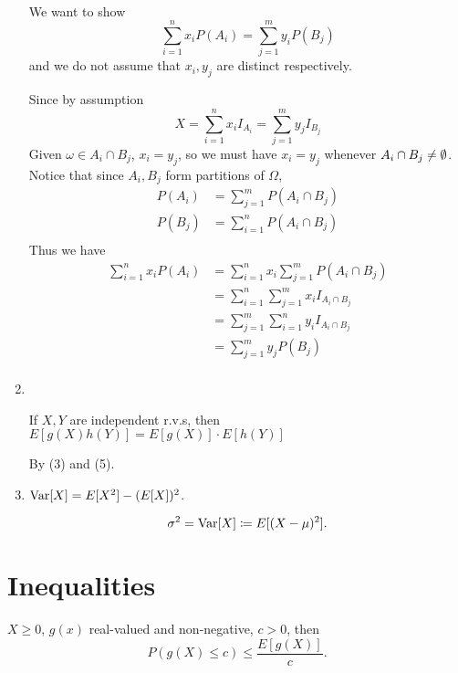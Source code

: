 \documentclass[class=article,crop=false]{standalone}
\begin{document}
\begin{claim}[]
\begin{enumerate}[label=\arabic*)]
~\begin{prf}
We want to show 
\[
	\sum_{ i= 1}^{ n} x_i P(A_i) = \sum_{ j= 1}^{ m} y_i P(B_j)
\]
and we do not assume that $ x_i, y_j$ are distinct respectively.

Since by assumption
\[
	X= \sum_{ i= 1}^{ n} x_i I_{A_i} = \sum_{ j= 1}^{ m} y_j I_{B_j}
\] 
Given $ \omega \in A_i \cap B_j$, $x_i = y_j$, so we must have $ x_i=y_j$ whenever $ A_i \cap B_j \neq \emptyset$. Notice that since $ A_i, B_j$ form partitions of $ \Omega$,
\begin{align*}
	P(A_i) &= \sum_{ j= 1}^{ m} P(A_i \cap B_j)\\
	P(B_j) &= \sum_{ i= 1}^{ n} P(A_i \cap B_j) \\
\end{align*}
Thus we have
\begin{align*}
	\sum_{ i= 1}^{ n} x_i P(A_i) &=\sum_{ i= 1}^{ n} x_i \sum_{ j= 1}^{ m} P(A_i \cap B_j) \\
	&= \sum_{ i= 1}^{ n} \sum_{ j= 1}^{ m} x_i I_{A_i \cap B_j} \\
	&= \sum_{ j= 1}^{ m} \sum_{ i= 1}^{ n} y_i I_{A_i \cap B_j}  \\
	&= \sum_{ j= 1}^{ m} y_j P(B_j) \\
\end{align*}
\end{prf}
\item
~\begin{coro}[]
	If $ X,Y$ are independent r.v.s, then  $ E[g(X)h(Y)]=E[g(X)] \cdot E[h(Y)]$
\end{coro}
\begin{note}[]
	By (3) and (5).
\end{note}
\item $ \operatorname{Var}[X] = E[X^2] - (E[X])^2$.
~\begin{defn}[variance]
\[
	\sigma^2= \operatorname{Var}[X] \coloneqq E[(X-\mu)^2]
.\]
\end{defn}

\end{enumerate}
\end{claim}


\section{Inequalities}
\begin{thm}
 $ X \geq 0$,  $ g(x)$ real-valued and non-negative,  $ c>0$, then
		 \[
			 P(g(X)\leq c) \leq \frac{E[g(X)]}{c }
		.\]
\end{thm}
\end{document}
